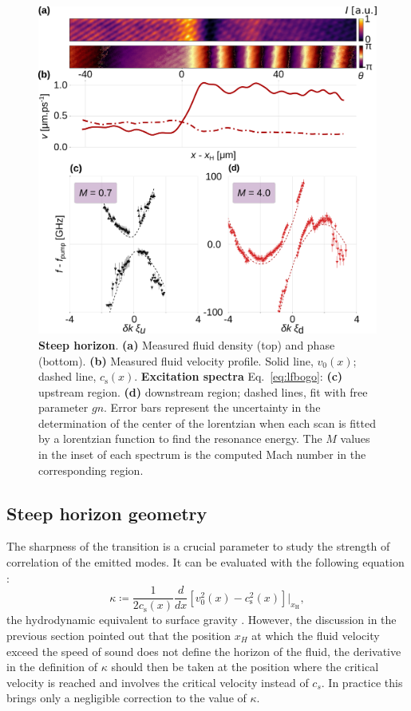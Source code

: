\begin{figure}
    \centering
    \includegraphics[width=1\textwidth]{chap_custom_st/fig/bh_steep.pdf}
    \caption{\textbf{Steep horizon}.    
    \textbf{(a)} Measured fluid density (top) and phase (bottom).
    \textbf{(b)} Measured fluid velocity profile.
    Solid line, $v_0(x)$; dashed line, $c_\mathrm{s}(x)$.
    \textbf{Excitation spectra} Eq.~\eqref{eq:lfbogo}: \textbf{(c)} upstream region. \textbf{(d)} downstream region; dashed lines, fit with free parameter $gn$. Error bars represent the uncertainty in the determination
    of the center of the lorentzian when each scan is fitted by a lorentzian function to find the resonance energy. The $M$ values in the inset of each spectrum is the computed Mach number in the corresponding region. }
    \label{fig:bh_steep}
\end{figure}
\clearpage

\subsection{Steep horizon geometry}

The sharpness of the transition is a crucial parameter to study the strength of correlation of the emitted modes. It can be evaluated with the following equation :
\begin{equation}
    \kappa \coloneqq \frac{1}{2c_\mathrm{s}(x)}\frac{d}{dx}[v^2_0(x)-c^2_\mathrm{s}(x)]|_{x_\mathrm{H}},
    \label{eq:steepness}
\end{equation}
the hydrodynamic equivalent to surface gravity \cite{barcelo_hawking-like_2006}. However, the discussion in the previous section 
pointed out that the position $x_H$ at which the fluid velocity exceed the speed of sound does not define the horizon of the fluid, the derivative
in the definition of $\kappa$ should then be taken at the position where the critical velocity is reached and involves the critical velocity instead of $c_s$.
In practice this brings only a negligible correction to the value of $\kappa$. 

